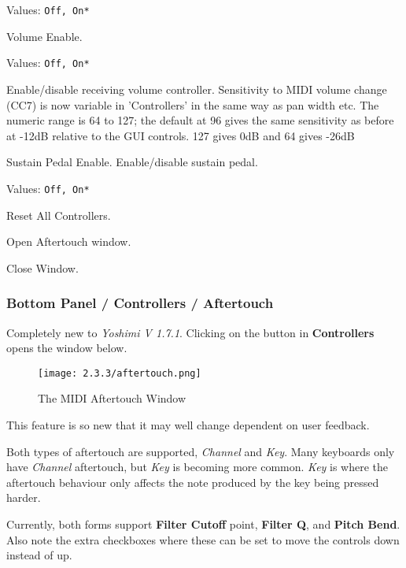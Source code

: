    Values: \texttt{Off, On*}

   Volume Enable.

   Values: \texttt{Off, On*}

   Enable/disable receiving volume controller.
   Sensitivity to MIDI volume change (CC7) is now variable in 'Controllers'
   in the same way as pan width etc. The numeric range is 64 to 127; the
   default at 96 gives the same sensitivity as before at -12dB relative to
   the GUI controls. 127 gives 0dB and 64 gives -26dB

   Sustain Pedal Enable.
   Enable/disable sustain pedal.

   Values: \texttt{Off, On*}

   Reset All Controllers.

   Open Aftertouch window.

   Close Window.

\subsubsection{Bottom Panel / Controllers / Aftertouch}
\label{subsubsec:bottom_panel_controllers_aftertouch}

   Completely new to \textsl{Yoshimi V 1.7.1}. Clicking on the button
   in \textbf{Controllers} opens the window below.

\begin{figure}[H]
   \centering
   \texttt{[image: 2.3.3/aftertouch.png]}
   \caption{The MIDI Aftertouch Window}
   \label{fig:instrument_midi_aftertouch}
\end{figure}

This feature is so new that it may well change dependent on user feedback.

Both types of aftertouch are supported, \textsl{Channel} and \textsl{Key}. Many
keyboards only have \textsl{Channel} aftertouch, but \textsl{Key} is becoming
more common. \textsl{Key} is where the aftertouch
behaviour only affects the note produced by the key being pressed harder.

Currently, both forms support \textbf{Filter Cutoff} point,
\textbf{Filter Q}, and
\textbf{Pitch Bend}. Also note the extra checkboxes where these can be set to
move the controls down instead of up.

